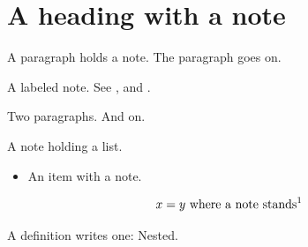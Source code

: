\flmHeading[toc=true]
\section{A heading with a note}{\flmLabels{\label{ref1}}}

A paragraph holds a note. The paragraph goes on.

A labeled note. See ,  and .

Two paragraphs. And on.

A note holding a list.

\begin{itemize}
\item An item with a note.
\end{itemize}

\begin{equation}
x = y \text{ where a note stands\flmXNfootnote{The formula's note.}}
\end{equation}

A definition writes one: \flmUDnoted{} Nested.

